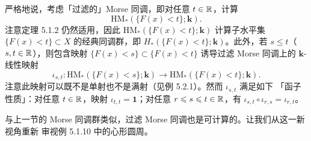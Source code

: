 严格地说，考虑「过滤的」Morse 同调，即对任意 $t\in\mathbb{R}$，计算
\begin{equation}\tag{5.11}
\mathrm{HM}_*\left(\{F(x)<t\};\mathbf k\right).
\end{equation}
注意定理 5.1.2 仍然适用，因此
$\mathrm{HM}_*(\{F(x)<t\};\mathbf k)$ 计算子水平集
$\{F(x)<t\}\subset X$ 的经典同调群，即
$H_*(\{F(x)<t\};\mathbf k)$。此外，若 $s\leqslant t$（$s,t\in\mathbb{R}$），则包含映射
$\{F(x)<s\}\subset\{F(x)<t\}$ 诱导过滤 Morse 同调上的 $\mathbf k$-线性映射
\begin{equation}\tag{5.12}
\iota_{s,t}:\mathrm{HM}_*(\{F(x)<s\};\mathbf k)
\to\mathrm{HM}_*(\{F(x)<t\};\mathbf k).
\end{equation}
注意此映射可以既不是单射也不是满射（见例 5.2.1）。然而 $\iota_{s,t}$ 满足如下
「函子性质」：对任意 $t\in\mathbb{R}$，映射 $\iota_{t,t}=\mathbf 1$；对任意
$r\leqslant s\leqslant t\in\mathbb{R}$，有 $\iota_{s,t}\circ\iota_{r,s}=\iota_{r,t}$。


与上一节的 Morse 同调群类似，过滤 Morse 同调也是可计算的。让我们从这一新视角重新
审视例 5.1.10 中的心形圆周。

